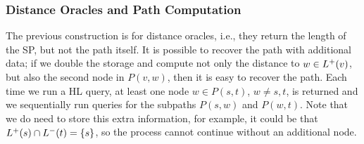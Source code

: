 \subsubsection{Distance Oracles and Path Computation} \label{sec:path_oracl}
The previous construction is for distance oracles, i.e., they return the length of the SP, but not the path itself.
It is possible to recover the path with additional data; if we double the storage and compute not only the distance to $w\in L^+(v)$, but also the second node in $P(v,w)$, then it is easy to recover the path.
Each time we run a HL query, at least one node $w\in P(s,t)$, $w\neq s,t$, is returned and we sequentially run queries for the subpaths $P(s,w)$ and $P(w,t)$.
Note that we do need to store this extra information, for example, it could be that $L^+(s)\cap L^-(t)=\{s\}$, so the process cannot continue without an additional node.
